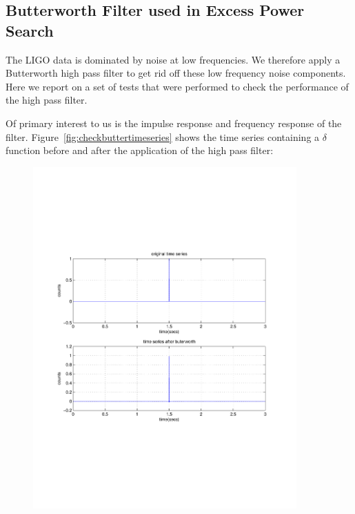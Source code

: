 \clearpage

\subsection{Butterworth Filter used in Excess Power Search}

The LIGO data is dominated by noise at low frequencies. We 
therefore apply a Butterworth high pass filter to get rid off these 
low frequency noise components. Here we report on a set of tests 
that were performed to check the performance of the high pass filter.

Of primary interest to us is the impulse response and frequency response 
of the filter. Figure~\ref{fig:checkbuttertimeseries} shows the 
time series containing a $\delta$ function before and after the 
application of the high pass filter:
\begin{figure}[h]
\begin{center}
\includegraphics[width=0.9\textwidth]{figures/checkbuttertimeseries}

\end{center}
\end{figure}
